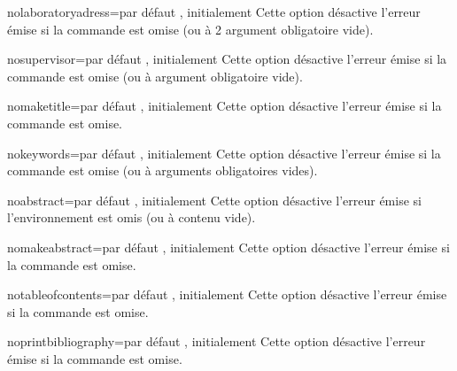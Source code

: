 \begin{description}
\begin{docKey}{nolaboratoryadress}{=\textbar{}}{par
      défaut , initialement }
    Cette option désactive l'erreur émise si la commande 
    est omise (ou à 2\ieme{} argument obligatoire vide).
  \end{docKey}
  \begin{docKey}{nosupervisor}{=\textbar{}}{par
      défaut , initialement }
    Cette option désactive l'erreur émise si la commande 
    est omise (ou à argument obligatoire vide).
  \end{docKey}
  \begin{docKey}{nomaketitle}{=\textbar{}}{par
      défaut , initialement }
    Cette option désactive l'erreur émise si la commande  est
    omise.
  \end{docKey}
  \begin{docKey}{nokeywords}{=\textbar{}}{par
      défaut , initialement }
    Cette option désactive l'erreur émise si la commande  est
    omise (ou à arguments obligatoires vides).
  \end{docKey}
  \begin{docKey}{noabstract}{=\textbar{}}{par
      défaut , initialement }
    Cette option désactive l'erreur émise si l'environnement 
    est omis (ou à contenu vide).
  \end{docKey}
  \begin{docKey}{nomakeabstract}{=\textbar{}}{par
      défaut , initialement }
    Cette option désactive l'erreur émise si la commande 
    est omise.
  \end{docKey}
  \begin{docKey}{notableofcontents}{=\textbar{}}{par
      défaut , initialement }
    Cette option désactive l'erreur émise si la commande
     est omise.
  \end{docKey}
  \begin{docKey}{noprintbibliography}{=\textbar{}}{par
      défaut , initialement }
    Cette option désactive l'erreur émise si la commande
     est omise.
  \end{docKey}
\end{description}

